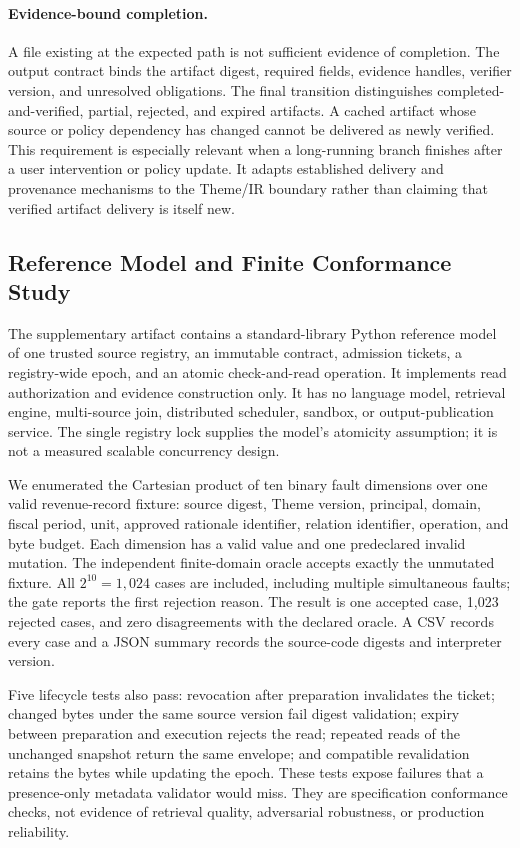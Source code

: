 \paragraph{Evidence-bound completion.}
A file existing at the expected path is not sufficient evidence of completion. The output contract binds the artifact digest, required fields, evidence handles, verifier version, and unresolved obligations. The final transition distinguishes completed-and-verified, partial, rejected, and expired artifacts. A cached artifact whose source or policy dependency has changed cannot be delivered as newly verified. This requirement is especially relevant when a long-running branch finishes after a user intervention or policy update. It adapts established delivery and provenance mechanisms to the Theme/IR boundary rather than claiming that verified artifact delivery is itself new.

\subsection{Reference Model and Finite Conformance Study}
\label{sec:ir-conformance}

The supplementary artifact contains a standard-library Python reference model of one trusted source registry, an immutable contract, admission tickets, a registry-wide epoch, and an atomic check-and-read operation. It implements read authorization and evidence construction only. It has no language model, retrieval engine, multi-source join, distributed scheduler, sandbox, or output-publication service. The single registry lock supplies the model's atomicity assumption; it is not a measured scalable concurrency design.

We enumerated the Cartesian product of ten binary fault dimensions over one valid revenue-record fixture: source digest, Theme version, principal, domain, fiscal period, unit, approved rationale identifier, relation identifier, operation, and byte budget. Each dimension has a valid value and one predeclared invalid mutation. The independent finite-domain oracle accepts exactly the unmutated fixture. All $2^{10}=1{,}024$ cases are included, including multiple simultaneous faults; the gate reports the first rejection reason. The result is one accepted case, 1{,}023 rejected cases, and zero disagreements with the declared oracle. A CSV records every case and a JSON summary records the source-code digests and interpreter version.

Five lifecycle tests also pass: revocation after preparation invalidates the ticket; changed bytes under the same source version fail digest validation; expiry between preparation and execution rejects the read; repeated reads of the unchanged snapshot return the same envelope; and compatible revalidation retains the bytes while updating the epoch. These tests expose failures that a presence-only metadata validator would miss. They are specification conformance checks, not evidence of retrieval quality, adversarial robustness, or production reliability.

